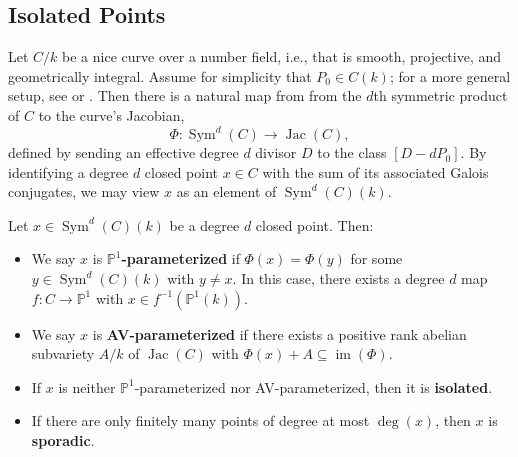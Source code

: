 \documentclass{amsart}
\theoremstyle{definition}
\newcommand{\Jac}{\operatorname{Jac}}
\newcommand{\Sym}{\operatorname{Sym}}
\DeclareMathOperator{\im}{im}
\begin{document}
\subsection{Isolated Points}\label{IsolatedPoints}
Let $C/k$ be a nice curve over a number field, i.e., that is smooth, projective, and geometrically integral. Assume for simplicity that $P_0\in C(k)$; for a more general setup, see \cite[$\S4$]{BELOV} or \cite{VirayVogt}. Then there is a natural map from from the $d$th symmetric product of $C$ to the curve's Jacobian,
\[
\Phi:\Sym^d(C) \rightarrow \Jac(C),
\]
defined by sending an effective degree $d$ divisor $D$ to the class $[D-dP_0]$. By identifying a degree $d$ closed point $x\in C$ with the sum of its associated Galois conjugates, we may view $x$ as an element of $\Sym^d(C)(k)$.

Let $x\in \Sym^d(C)(k)$ be a degree $d$ closed point. Then:
\begin{itemize}
    \item We say $x$ is \textbf{$\mathbb{P}^1$-parameterized} if $\Phi(x)=\Phi(y)$ for some $y\in \Sym^d(C)(k)$ with $y \neq x$. In this case, there exists a degree $d$ map $f: C \rightarrow \mathbb{P}^1$ with $x \in f^{-1}(\mathbb{P}^1(k))$.
    \item We say $x$ is \textbf{AV-parameterized} if there exists a positive rank abelian subvariety $A/k$ of $\Jac(C)$ with $\Phi(x)+A \subseteq \im(\Phi)$.
    \item If $x$ is neither $\mathbb{P}^1$-parameterized nor AV-parameterized, then it is \textbf{isolated}.
    \item If there are only finitely many points of degree at most $\deg(x)$, then $x$ is \textbf{sporadic}.
\end{itemize}
\end{document}
